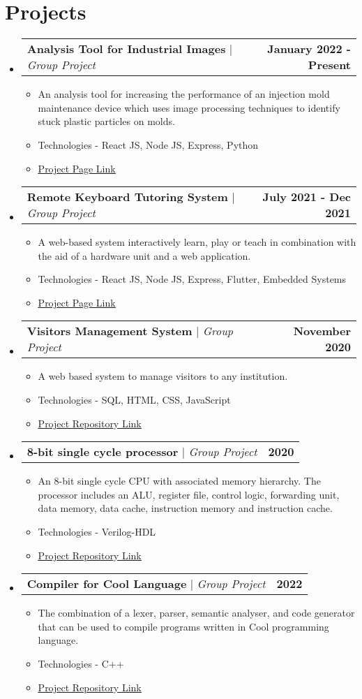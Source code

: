 \documentclass[letterpaper,11pt]{article}
\makeatletter
\newcommand{\resumeItem}[1]{
  \item\small{
    {#1 \vspace{-2pt}}
  }
}
\newcommand{\resumeProjectHeading}[2]{
    \item
    \begin{tabular*}{1.001\textwidth}{l@{\extracolsep{\fill}}r}
      \small#1 & \textbf{\small #2}\\
    \end{tabular*}\vspace{-7pt}
}
\newcommand{\resumeSubHeadingListStart}{\begin{itemize}[leftmargin=0.0in, label={}]}
\newcommand{\resumeSubHeadingListEnd}{\end{itemize}}
\newcommand{\resumeItemListStart}{\begin{itemize}}
\newcommand{\resumeItemListEnd}{\end{itemize}\vspace{-5pt}}
\makeatother
\begin{document}
\section{Projects}
    \vspace{-5pt}
    \resumeSubHeadingListStart
    \resumeProjectHeading
          {\textbf{Analysis Tool for Industrial Images} $|$ \emph{Group Project}}{January 2022 - Present}
          \resumeItemListStart
            \resumeItem{An analysis tool for increasing the performance of an injection mold maintenance device which uses image processing techniques to identify stuck plastic particles on molds.}
            \resumeItem{Technologies - React JS, Node JS, Express, Python}
            \resumeItem{\underline{\href{https://github.com/cepdnaclk/e17-co328-Analysis-Tool-for-Industrial-Images}{Project Page Link}}}
          \resumeItemListEnd
          \vspace{-13pt}
      \resumeProjectHeading
          {\textbf{Remote Keyboard Tutoring System} $|$ \emph{Group Project}}{July 2021 - Dec 2021}
          \resumeItemListStart
            \resumeItem{A web-based system interactively learn, play or teach in combination with the aid of a hardware unit and a web application.}
            \resumeItem{Technologies - React JS, Node JS, Express, Flutter, Embedded Systems}
            \resumeItem{\underline{\href{https://projects.ce.pdn.ac.lk/3yp/e17/remote-keyboard-tutoring-system/}{Project Page Link}}}
          \resumeItemListEnd
          \vspace{-13pt}
      \resumeProjectHeading
          {\textbf{Visitors Management System} $|$ \emph{Group Project}}{November 2020}
          \resumeItemListStart
            \resumeItem{A web based system to manage visitors to any institution.}
            \resumeItem{Technologies - SQL, HTML, CSS, JavaScript}
            \resumeItem{\underline{\href{https://github.com/dinuransika/Visitor-Management-System-1}{Project Repository Link}}}
          \resumeItemListEnd 
          \vspace{-13pt}
          \resumeProjectHeading
          {\textbf{8-bit single cycle processor} $|$ \emph{Group Project}}{2020}
          \resumeItemListStart
            \resumeItem{An 8-bit single cycle CPU with associated memory hierarchy. The processor includes an ALU, register file, control logic,
            forwarding unit, data memory, data cache, instruction memory and instruction cache.}
            \resumeItem{Technologies - Verilog-HDL}
           \resumeItem{\underline{\href{https://github.com/dinuransika/8-bit-single-cycle-processor}{Project Repository Link}}}
          \resumeItemListEnd
          \vspace{-13pt}
          \resumeProjectHeading
          {\textbf{Compiler for Cool Language} $|$ \emph{Group Project}}{2022}
          \resumeItemListStart
            \resumeItem{The combination of a lexer, parser, semantic analyser, and code generator that can be used to compile programs written
        in Cool programming language.}
            \resumeItem{Technologies - C++}
           \resumeItem{\underline{\href{https://github.com/dinuransika/CO521_Compilers}{Project Repository Link}}}
          \resumeItemListEnd
    \resumeSubHeadingListEnd
\vspace{-15pt}
\end{document}
